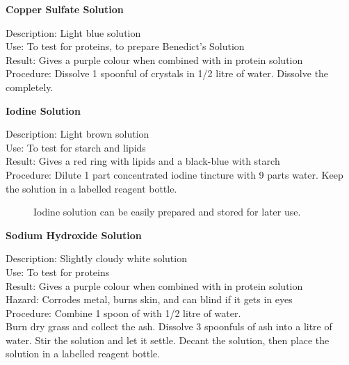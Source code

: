\begin{flushleft}
\textbf{Copper Sulfate Solution}
\end{flushleft}
\vspace{-10pt}
Description: Light blue solution\\
Use: To test for proteins, to prepare Benedict's Solution\\
Result: Gives a purple colour when combined with  in protein solution\\
Procedure: Dissolve 1 spoonful of  crystals in 1/2 litre of water. Dissolve the  completely.\\

\begin{flushleft}
\textbf{Iodine Solution}
\end{flushleft}
\vspace{-10pt}
Description: Light brown solution\\
Use: To test for starch and lipids\\
Result: Gives a red ring with lipids and a black-blue with starch\\
Procedure: Dilute 1 part concentrated iodine tincture with 9 parts water. Keep the solution in a labelled reagent bottle.\\

\begin{figure}[h]
\begin{center}
\def\svgwidth{2cm}

\caption{Iodine solution can be easily prepared and stored for later use.}
\label{fig:iodine}
\end{center}
\end{figure}

\begin{flushleft}
\textbf{Sodium Hydroxide Solution}
\end{flushleft}
\vspace{-10pt}
Description: Slightly cloudy white solution\\
Use: To test for proteins\\
Result: Gives a purple colour when combined with  in protein solution\\
Hazard: Corrodes metal, burns skin, and can blind if it gets in eyes\\
Procedure: Combine 1 spoon of  with 1/2 litre of water.\\
Burn dry grass and collect the ash. Dissolve 3 spoonfuls of ash into a litre of water. Stir the solution and let it settle. Decant the solution, then place the solution in a labelled reagent bottle.

